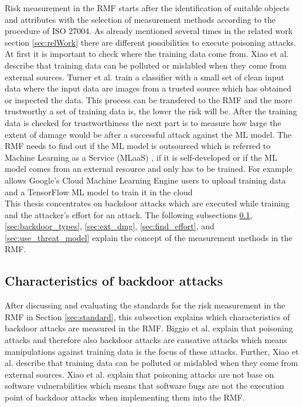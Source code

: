 Risk measurement in the RMF starts after the identification of suitable objects and attributes with the selection of measurement methods according to the procedure of ISO 27004. As already mentioned several times in the related work section \ref{sec:relWork} there are different possibilities to execute poisoning attacks. At first it is important to check where the training data come from. Xiao et al. \cite{DBLP:conf/sp/XiaoLZX18} describe that training data can be polluted or mislabled when they come from external sources. Turner et al. train a classifier with a small set of clean input data where the input data are images from a trusted source which has obtained or inspected the data. This process can be transfered to the RMF and the more trustworthy a set of training data is, the lower the risk will be. After the training data is checked for trustworthiness the next part is to measure how large the extent of damage would be after a successful attack against the ML model. The RMF needs to find out if the ML model is outsourced which is referred to Machine Learning as a Service (MLaaS) \cite{DBLP:journals/corr/abs-1708-06733}, if it is self-developed or if the ML model comes from an external resource and only has to be trained. For example allows Google's Cloud Machine Learning Engine \cite{google_ai2022} users to upload training data and a TensorFlow ML model to train it
in the cloud \cite{DBLP:journals/corr/abs-1708-06733} \\ This thesis concentrates on backdoor attacks which are executed while training and the attacker's effort for an attack. The following
subsections \ref{sec:charac_backdoor}, \ref{sec:backdoor_types}, \ref{sec:ext_dmg}, \ref{sec:find_effort}, and \ref{sec:use_threat_model} explain the concept of the measurement methods in the RMF.

\subsection{Characteristics of backdoor attacks}
\label{sec:charac_backdoor}

After discussing and evaluating the standards for the risk measurement in the RMF in Section \ref{sec:standard}, this subsection explains which characteristics of backdoor attacks are measured in the RMF. Biggio et al. \cite{DBLP:conf/icml/BiggioNL12} explain that poisoning attacks and therefore also backdoor attacks are causative attacks which means manipulations against training data is the focus of these attacks. Further, Xiao et al. \cite{DBLP:conf/sp/XiaoLZX18} describe that training data can be polluted or mislabled when they come from external sources. Xiao et al. explain that poisoning attacks are not base on software vulnerabilities which means that software bugs are not the execution point of backdoor attacks when implementing them into the RMF.

